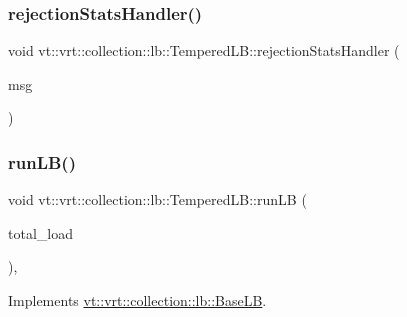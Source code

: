 \mbox{\label{structvt_1_1vrt_1_1collection_1_1lb_1_1_tempered_l_b_a356437aa1e6f698f6fb13aad99f0afb0}} 
\subsubsection{\texorpdfstring{rejection\+Stats\+Handler()}{rejectionStatsHandler()}}
{\footnotesize\ttfamily void vt\+::vrt\+::collection\+::lb\+::\+Tempered\+L\+B\+::rejection\+Stats\+Handler (\begin{DoxyParamCaption}\item[{\hyperlink{structvt_1_1vrt_1_1collection_1_1lb_1_1_tempered_l_b_af1c8105006c9150e33347c66018e143e}{Rejection\+Msg\+Type} $\ast$}]{msg }\end{DoxyParamCaption})\hspace{0.3cm}{\ttfamily [protected]}}

\mbox{\label{structvt_1_1vrt_1_1collection_1_1lb_1_1_tempered_l_b_a18efa54b58d642d8bb1cd373514e814f}} 
\subsubsection{\texorpdfstring{run\+L\+B()}{runLB()}}
{\footnotesize\ttfamily void vt\+::vrt\+::collection\+::lb\+::\+Tempered\+L\+B\+::run\+LB (\begin{DoxyParamCaption}\item[{\hyperlink{namespacevt_a876a9d0cd5a952859c72de8a46881442}{Time\+Type}}]{total\+\_\+load }\end{DoxyParamCaption})\hspace{0.3cm}{\ttfamily [override]}, {\ttfamily [virtual]}}



Implements \hyperlink{structvt_1_1vrt_1_1collection_1_1lb_1_1_base_l_b_a7caaf2483f046927fd7534a084a8c1b2}{vt\+::vrt\+::collection\+::lb\+::\+Base\+LB}.

